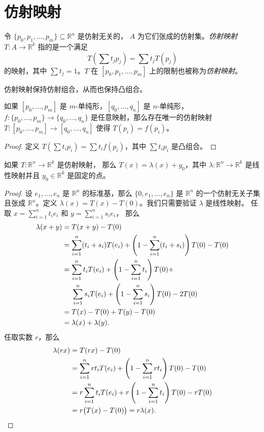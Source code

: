 \documentclass[fontset=none]{Notes}
\begin{document}
\section{仿射映射}

\begin{definition}
  令 $\{p_0,p_1,\dots,p_m\}\subseteq \mathbb{R}^n$ 是仿射无关的，
  $A$ 为它们张成的仿射集。\emph{仿射映射} $T:A\to \mathbb{R}^k$
  指的是一个满足
  \[
    T\left(\sum t_jp_j\right)=\sum t_j T(p_j)
  \]
  的映射，其中 $\sum t_j=1$。$T$ 在 $[p_0,p_1,\dots,p_m]$
  上的限制也被称为\emph{仿射映射}。
\end{definition}

仿射映射保持仿射组合，从而也保持凸组合。

\begin{theorem}
  如果 $[p_0,\dots,p_m]$ 是 $m$-单纯形，$[q_0,\dots,q_n]$
  是 $n$-单纯形，$f:\{p_0,\dots,p_m\}\to\{q_0,\dots,q_n\}$
  是任意映射，那么存在唯一的仿射映射 $T:[p_0,\dots,p_m]\to [q_0,\dots,q_n]$
  使得 $T(p_i)=f(p_i)$。
\end{theorem}
\begin{proof}
  定义 $T\left(\sum t_ip_i\right)=\sum t_i f(p_i)$，其中 $\sum t_ip_i$
  是凸组合。
\end{proof}

\begin{problem}{}{}
  如果 $T:\mathbb{R}^n\to \mathbb{R}^k$ 是仿射映射，
  那么 $T(x)=\lambda(x)+y_0$，其中 $\lambda:\mathbb{R}^n\to \mathbb{R}^k$
  是线性映射并且 $y_0\in \mathbb{R}^k$ 是固定的点。
\end{problem}
\begin{proof}
  设 $e_1,\dots,e_n$ 是 $\mathbb{R}^n$ 的标准基，那么 $\{0,e_1,\dots,e_n\}$
  是 $\mathbb{R}^n$ 的一个仿射无关子集且张成 $\mathbb{R}^n$。定义 
  $\lambda(x)=T(x)-T(0)$。我们只需要验证 $\lambda$ 是线性映射。
  任取 $x=\sum_{i=1}^n t_ie_i$ 和 $y=\sum_{i=1}^n s_ie_i$，
  那么 
  \begin{align*}
    \lambda(x+y)&=T(x+y)-T(0)\\
    &=
    \sum_{i=1}^n (t_i+s_i)T(e_i)+\left(1-\sum_{i=1}^n(t_i+s_i)\right)T(0)-T(0)\\
    &=\sum_{i=1}^n t_iT(e_i)+\left(1-\sum_{i=1}^n t_i\right)T(0)+\\
    &\hphantom{{}={}}\sum_{i=1}^n s_iT(e_i)+\left(1-\sum_{i=1}^n s_i\right)T(0)
    -2T(0)\\
    &=T(x)-T(0)+T(y)-T(0)\\
    &=\lambda(x)+\lambda(y).
  \end{align*}
  任取实数 $r$，那么 
  \begin{align*}
    \lambda(rx)&=T(rx)-T(0)\\
    &=\sum_{i=1}^n rt_iT(e_i)+\left(1-\sum_{i=1}^nrt_i\right)T(0)-T(0)\\
    &=r\sum_{i=1}^n t_iT(e_i)+r\left(1-\sum_{i=1}^n t_i\right)T(0)-rT(0)\\
    &=r\bigl(T(x)-T(0)\bigr)=r\lambda(x).\qedhere
  \end{align*}
\end{proof}
\end{document}
